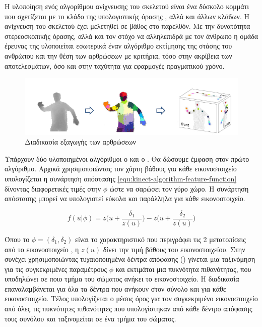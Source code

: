 Η υλοποίηση ενός αλγορίθμου ανίχνευσης του σκελετού είναι ένα δύσκολο κομμάτι που σχετίζεται με το κλάδο της υπολογιστικής όρασης \cite{mubarak97}, αλλά και άλλων κλάδων. Η ανίχνευση του σκελετού έχει μελετηθεί σε βάθος \cite{moseslund01, poppe07} στο παρελθόν. Με την δυνατότητα στερεοσκοπικής όρασης, αλλά και τον στόχο να αλληλεπιδρά με τον άνθρωπο η ομάδα έρευνας της  υλοποιείται εσωτερικά έναν αλγόριθμο εκτίμησης της στάσης του ανθρώπου και την θέση των αρθρώσεων \cite{shotton11} με κριτήρια, τόσο στην ακρίβεια των αποτελεσμάτων, όσο και στην ταχύτητα για εφαρμογές πραγματικού χρόνο.

\begin{figure}[H]
    \centering
    \includegraphics[width=.9\textwidth, keepaspectratio]{fig/kinect-skeleton-algorithm.png}
    \caption{Διαδικασία εξαγωγής των αρθρώσεων \cite{shotton11}}
    \label{fig:kinect-skeleton-algorithm}
\end{figure}

Υπάρχουν δύο υλοποιημένοι αλγόριθμοι ο  και ο . Θα δώσουμε έμφαση στον πρώτο αλγόριθμο. Αρχικά χρησιμοποιώντας τον χάρτη βάθους για κάθε εικονοστοιχείο υπολογίζεται η συνάρτηση απόστασης \ref{equ:kinect-algorithm-feature-function} δίνοντας διαφορετικές τιμές στην $\phi$ ώστε να σαρώσει τον γύρο χώρο. Η συνάρτηση απόστασης μπορεί να υπολογιστεί εύκολα και παράλληλα για κάθε εικονοστοιχείο.

\begin{equation}
    f(u|\phi ) = z\big( u + \frac{\delta_1}{z(u)}\big)-z\big( u + \frac{\delta_2}{z(u)}\big)
    \label{equ:kinect-algorithm-feature-function}
\end{equation}

Όπου το $\phi = (\delta_1, \delta_2)$ είναι το χαρακτηριστικό που περιγράφει τις 2 μετατοπίσεις από το εικονοστοιχείο , η $z(u)$ δίνει την τιμή βάθους του εικονοστοιχείου. Στην συνέχει χρησιμοποιώντας τυχαιοποιημένα δέντρα απόφασης () γίνεται μια ταξινόμηση για τις συγκεκριμένες παραμέτρους $\phi$ και εκτιμάται μια πυκνότητα πιθανότητας, που υποδηλώνει σε ποιο τμήμα του σώματος ανήκει το εικονοστοιχείο. Η διαδικασία επαναλαμβάνεται για όλα τα δέντρα που ανήκουν στον σύνολο και για κάθε εικονοστοιχείο. Τέλος υπολογίζεται ο μέσος όρος για τον συγκεκριμένο εικονοστοιχείο από όλες τις πυκνότητες πιθανότητες που υπολογίστηκαν από κάθε δέντρο απόφασης τους συνόλου και ταξινομείται σε ένα τμήμα του σώματος.

